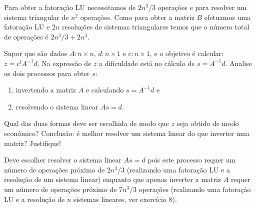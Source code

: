 \begin{questions}
\begin{solution}
        Para obter a fatora\c{c}\~{a}o LU necessitamos de $2 n^3 / 3$ opera\c{c}\~{o}es e para resolver um sistema triangular de $n^2$ opera\c{c}\~{o}es. Como para obter a matriz $B$ efetuamos uma fatora\c{c}\~{a}o LU e $2 n$ resolu\c{c}\~{o}es de sistemas triangulares temos que o n\'{u}mero total de opera\c{c}\~{o}es \'{e} $2 n^3 / 3 + 2 n^3$.
    \end{solution}

    \question Supor que s\~{a}o dados $A : n \times n$, $d: n \times 1$ e $c : n \times 1$, e o objetivo \'{e} calcular: $z = c^t A^{-1} d$. Na express\~{a}o de $z$ a dificuldade est\'{a} no c\'{a}lculo de $s = A^{-1} d$. Analise os dois processos para obter $s$:
    \begin{enumerate}
        \item invertendo a matriz $A$ e calculando $s = A^{-1} d$ e
        \item resolvendo o sistema linear $A s = d$.
    \end{enumerate}
    Qual das duas formas deve ser escolhida de modo que $z$ seja obtido de modo econômico? Conclus\~{a}o: \'{e} melhor resolver um sistema linear do que inverter uma matriz? Justifique!
    \begin{solution}
        Deve escolher resolver o sistema linear $A s = d$ pois este processo requer um n\'{u}mero de opera\c{c}\~{o}es pr\'{o}ximo de $2 n^3 / 3$ (realizando uma fatora\c{c}\~{a}o LU e a resolu\c{c}\~{a}o de um sistema linear) enquanto que apenas inverter a matriz $A$ requer um n\'{u}mero de opera\c{c}\~{o}es pr\'{o}ximo de $7 n^3 / 3$ opera\c{c}\~{o}es (realizando uma fatora\c{c}\~{a}o LU e a resolu\c{c}\~{a}o de $n$ sistemas lineares, ver exerc\'{i}cio 8).
    \end{solution}


\end{questions}
